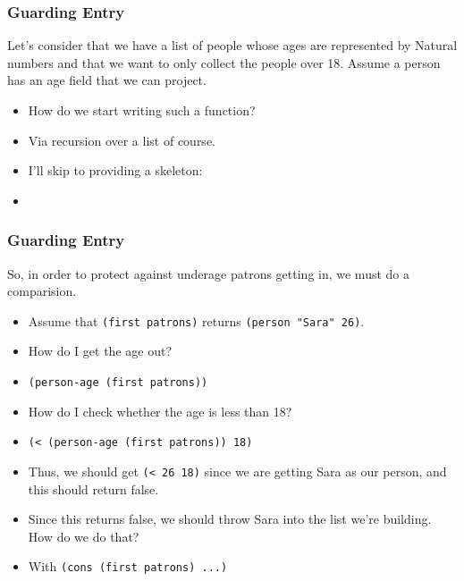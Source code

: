 \documentclass{beamer}
\begin{document}
\begin{frame}
  \frametitle{Guarding Entry}
  Let's consider that we have a list of people whose ages are represented by Natural numbers and that we want to only collect the people
  over 18. Assume a person has an age field that we can project.
  \begin{itemize}
  \item<2-> How do we start writing such a function?
  \item<3-> Via recursion over a list of course.
  \item<4-> I'll skip to providing a skeleton:
  \item<5-> \BarEntry
  \end{itemize}
\end{frame}

\begin{frame}
  \frametitle{Guarding Entry}
  So, in order to protect against underage patrons getting in, we must do a comparision.
  \begin{itemize}
  \item<2-> Assume that \texttt{(first patrons)} returns \texttt{(person "Sara" 26)}.
  \item<3-> How do I get the age out?
  \item<4-> \texttt{(person-age (first patrons))}
  \item<5-> How do I check whether the age is less than 18?
  \item<6-> \texttt{(< (person-age (first patrons)) 18)}
  \item<7-> Thus, we should get \texttt{(< 26 18)} since we are getting Sara as our person,
    and this should return false.
  \item<8-> Since this returns false, we should throw Sara into the list we're building. How do we do that?
  \item<9-> With \texttt{(cons (first patrons) ...)}  
  \end{itemize}
\end{frame}
\end{document}
